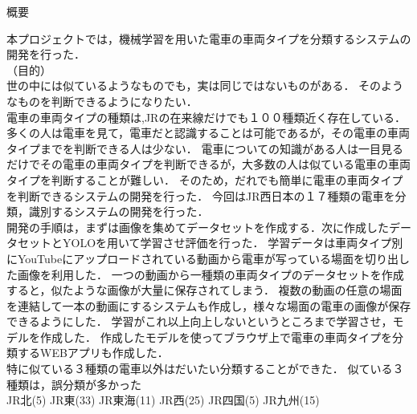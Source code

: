 

\begin{center}
		{\gtfamily \Large 概要}
\end{center}
\vspace{1cm}
\thispagestyle{empty}	



本プロジェクトでは，機械学習を用いた電車の車両タイプを分類するシステムの開発を行った．\\
（目的）\\
世の中には似ているようなものでも，実は同じではないものがある．
そのようなものを判断できるようになりたい．\\
電車の車両タイプの種類は,JRの在来線だけでも１００種類近く存在している．
多くの人は電車を見て，電車だと認識することは可能であるが，その電車の車両タイプまでを判断できる人は少ない．
電車についての知識がある人は一目見るだけでその電車の車両タイプを判断できるが，大多数の人は似ている電車の車両タイプを判断することが難しい．
そのため，だれでも簡単に電車の車両タイプを判断できるシステムの開発を行った．
今回はJR西日本の１７種類の電車を分類，識別するシステムの開発を行った．\\
開発の手順は，まずは画像を集めてデータセットを作成する．次に作成したデータセットとYOLOを用いて学習させ評価を行った．
学習データは車両タイプ別にYouTubeにアップロードされている動画から電車が写っている場面を切り出した画像を利用した．
一つの動画から一種類の車両タイプのデータセットを作成すると，似たような画像が大量に保存されてしまう．
複数の動画の任意の場面を連結して一本の動画にするシステムも作成し，様々な場面の電車の画像が保存できるようにした．
学習がこれ以上向上しないというところまで学習させ，モデルを作成した．
作成したモデルを使ってブラウザ上で電車の車両タイプを分類するWEBアプリも作成した．\\
特に似ている３種類の電車以外はだいたい分類することができた．
似ている３種類は，誤分類が多かった
\\
JR北(5)
JR東(33)
JR東海(11)
JR西(25)
JR四国(5)
JR九州(15)
\clearpage
